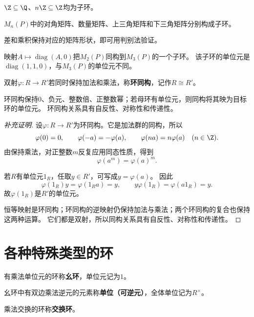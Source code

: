 \begin{example}
$\Z\subseteq\Q$、$n\Z\subseteq\Z$均为子环。

$M_n(P)$中的对角矩阵、数量矩阵、上三角矩阵和下三角矩阵分别构成子环。

差和乘积保持对应的矩阵形状，即可用判别法验证。

映射$A\mapsto\operatorname{diag}(A,0)$把$M_2(P)$同构到$M_3(P)$的一个子环。
该子环的单位元是$\operatorname{diag}(1,1,0)$，与$M_3(P)$的单位元不同。
\end{example}

\begin{definition}
\label{p2:concept:c1-l923}双射$\varphi:R\to R'$若同时保持加法和乘法，称\textbf{环同构}，记作$R\cong R'$。
\end{definition}
\begin{proposition}
环同构保持$0$、负元、整数倍、正整数幂；若母环有单位元，则同构将其映为目标环的单位元。
环同构关系具有自反性、对称性和传递性。
\end{proposition}
\begin{proof}[补充证明]
设$\varphi:R\to R'$为环同构。它是加法群的同构，所以
\[
\varphi(0)=0,
\qquad \varphi(-a)=-\varphi(a),
\qquad \varphi(na)=n\varphi(a)\quad(n\in\Z).
\]
由保持乘法，对正整数$m$反复应用同态性质，得到
\[
\varphi(a^m)=\varphi(a)^m.
\]

若$R$有单位元$1_R$，任取$y\in R'$，可写成$y=\varphi(a)$。
因此
\[
\varphi(1_R)y=\varphi(1_Ra)=y,
\qquad y\varphi(1_R)=\varphi(a1_R)=y.
\]
故$\varphi(1_R)$是$R'$的单位元。

恒等映射是环同构；环同构的逆映射仍保持加法与乘法；两个环同构的复合也保持这两种运算。
它们都是双射，所以同构关系具有自反性、对称性和传递性。
\end{proof}
\section{各种特殊类型的环}
\begin{definition}
\label{p2:concept:c1-l954}有乘法单位元的环称\textbf{幺环}，单位元记为$1$。

\label{p2:concept:c1-l956}幺环中有双边乘法逆元的元素称\textbf{单位（可逆元）}，全体单位记为$R^\times$。

\label{p2:concept:c1-l958}乘法交换的环称\textbf{交换环}。
\end{definition}

